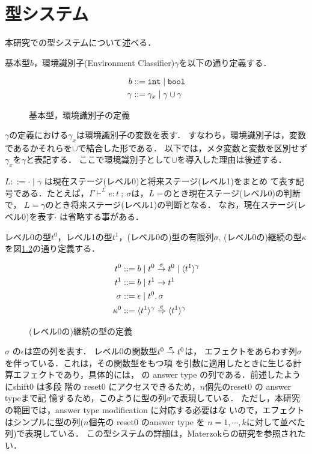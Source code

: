 \chapter{型システム}

本研究での型システムについて述べる．

基本型$b$，環境識別子(Environment Classifier)$\gamma$を以下の通り定義する．

\begin{figure}[H]
  \centering
  \begin{align*}
    b & ::= \mbox{\texttt{int}} \mid \mbox{\texttt{bool}} \\
    \gamma & ::= \gamma_x \mid \gamma \cup \gamma
  \end{align*}
  \caption{基本型，環境識別子の定義}
  \label{fig:bec_def}
\end{figure}

$\gamma$の定義における$\gamma_x$は環境識別子の変数を表す．
すなわち，環境識別子は，変数であるかそれらを$\cup$で結合した形である．
以下では，メタ変数と変数を区別せず$\gamma_x$を$\gamma$と表記する．
ここで環境識別子として$\cup$を導入した理由は後述する．

$L ::= \cdot \mid \gamma$ は現在ステージ(レベル0)と将来ステージ(レベル1)をまとめ
て表す記号である．たとえば，$\Gamma \vdash^L
e:t~;~\sigma$は，$L=\empty$のとき現在ステージ(レベル0)の判断で，
$L=\gamma$のとき将来ステージ(レベル1)の判断となる．
なお，現在ステージ(レベル0)を表す$\cdot$ は省略する事がある．

レベル0の型$t^0$，レベル1の型$t^1$，(レベル0の)型の有限列$\sigma$,
(レベル0の)継続の型$\kappa$を図\ref{fig:k_def}の通り定義する．

\begin{figure}[H]
  \centering
  \begin{align*}
    t^0 & ::= b \mid {t^0} \stackrel{\sigma}{\rightarrow} {t^0} \mid \langle{t^1}\rangle^{\gamma} \\
    t^1 & ::= b \mid t^1 \to t^1 \\
    \sigma & ::= \epsilon \mid t^0, \sigma \\
    \kappa^0 & ::= {\langle{t^1}\rangle^{\gamma}} \stackrel{\sigma}{\Rightarrow} {\langle{t^1}\rangle^{\gamma}}
  \end{align*}
  \caption{(レベル0の)継続の型の定義}
  \label{fig:k_def}
\end{figure}

$\sigma$ の$\epsilon$は空の列を表す．
レベル0の関数型${t^0} \stackrel{\sigma}{\rightarrow} {t^0}$は，
エフェクトをあらわす列$\sigma$を伴っている．これは，その関数型をもつ項
を引数に適用したときに生じる計算エフェクトであり，具体的には，
\Shiftz の answer type の列である．前述したようにshift0 は多段
階の reset0 にアクセスできるため，$n$個先のreset0 の answer typeまで記
憶するため，このように型の列$\sigma$で表現している．
ただし，本研究の範囲では，answer type modification に対応する必要はな
いので，エフェクトはシンプルに型の列($n$個先の reset0 のanswer type を
$n=1,\cdots,k$に対して並べた列)で表現している．
この型システムの詳細は，Materzokら\cite{Materzok2011}の研究を参照されたい．

